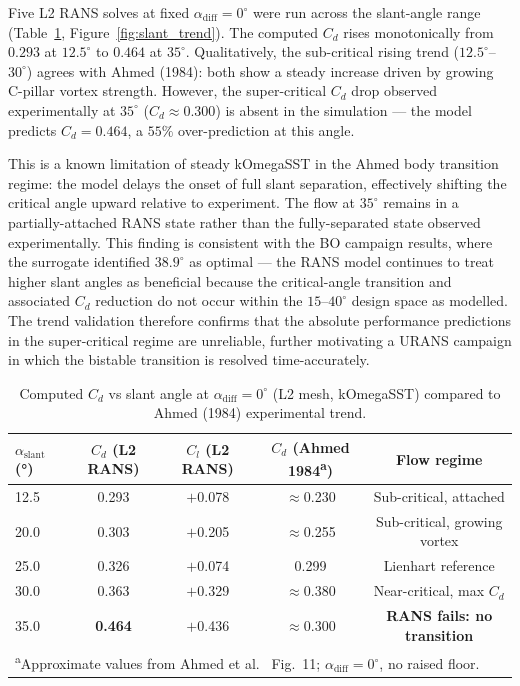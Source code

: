 Five L2 RANS solves at fixed $\alpha_\mathrm{diff}=0^\circ$ were run across the slant-angle range (Table~\ref{tab:slant_sweep}, Figure~\ref{fig:slant_trend}). The computed $C_d$ rises monotonically from $0.293$ at $12.5^\circ$ to $0.464$ at $35^\circ$. Qualitatively, the sub-critical rising trend ($12.5^\circ$--$30^\circ$) agrees with Ahmed (1984): both show a steady increase driven by growing C-pillar vortex strength. However, the super-critical $C_d$ drop observed experimentally at $35^\circ$ ($C_d \approx 0.300$) is absent in the simulation — the model predicts $C_d = 0.464$, a $55\%$ over-prediction at this angle.

This is a known limitation of steady kOmegaSST in the Ahmed body transition regime: the model delays the onset of full slant separation, effectively shifting the critical angle upward relative to experiment. The flow at $35^\circ$ remains in a partially-attached RANS state rather than the fully-separated state observed experimentally. This finding is consistent with the BO campaign results, where the surrogate identified $38.9^\circ$ as optimal — the RANS model continues to treat higher slant angles as beneficial because the critical-angle transition and associated $C_d$ reduction do not occur within the $15$--$40^\circ$ design space as modelled. The trend validation therefore confirms that the absolute performance predictions in the super-critical regime are unreliable, further motivating a URANS campaign in which the bistable transition is resolved time-accurately.

\begin{table}[h]
  \centering
  \caption{Computed $C_d$ vs slant angle at $\alpha_\mathrm{diff}=0^\circ$ (L2 mesh, kOmegaSST) compared to Ahmed (1984) experimental trend.}
  \label{tab:slant_sweep}
  \begin{tabular}{lcccc}
    \toprule
    $\alpha_\mathrm{slant}$ (°) & $C_d$ (L2 RANS) & $C_l$ (L2 RANS) & $C_d$ (Ahmed 1984\textsuperscript{a}) & Flow regime \\
    \midrule
    12.5 & 0.293 & $+$0.078 & ${\approx}$0.230 & Sub-critical, attached \\
    20.0 & 0.303 & $+$0.205 & ${\approx}$0.255 & Sub-critical, growing vortex \\
    25.0 & 0.326 & $+$0.074 & 0.299 \cite{lienhart2002} & Lienhart reference \\
    30.0 & 0.363 & $+$0.329 & ${\approx}$0.380 & Near-critical, max $C_d$ \\
    35.0 & \textbf{0.464} & $+$0.436 & ${\approx}$0.300 & \textbf{RANS fails: no transition} \\
    \bottomrule
    \multicolumn{5}{l}{\textsuperscript{a}Approximate values from Ahmed et al.~\cite{ahmed1984} Fig.~11; $\alpha_\mathrm{diff}=0^\circ$, no raised floor.}\\
  \end{tabular}
\end{table}

